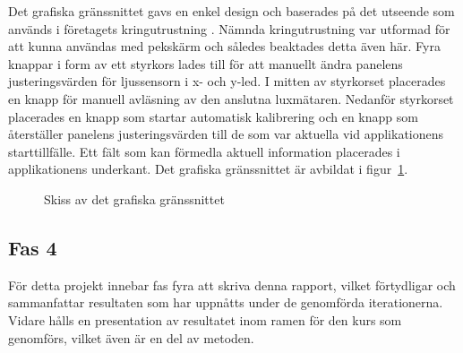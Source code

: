             Det grafiska gränssnittet gavs en enkel design och baserades på det utseende som används i företagets kringutrustning \cite{solarremote}. Nämnda kringutrustning var utformad för att kunna användas med pekskärm och således beaktades detta även här. Fyra knappar i form av ett styrkors lades till för att manuellt ändra panelens justeringsvärden för ljussensorn i x- och y-led. I mitten av styrkorset placerades en knapp för manuell avläsning av den anslutna luxmätaren. Nedanför styrkorset placerades en knapp som startar automatisk kalibrering och en knapp som återställer panelens justeringsvärden till de som var aktuella vid applikationens starttillfälle. Ett fält som kan förmedla aktuell information placerades i applikationens underkant. Det grafiska gränssnittet är avbildat i figur~\ref{fig:app_skiss}.

            \begin{figure}[hb]
                
            \caption{\label{fig:app_skiss} Skiss av det grafiska gränssnittet}
            \end{figure}



    \subsection{Fas 4} %
    \label{sub:fas_4}
        För detta projekt innebar fas fyra att skriva denna rapport, vilket förtydligar och sammanfattar resultaten som har uppnåtts under de genomförda iterationerna. Vidare hålls en presentation av resultatet inom ramen för den kurs som genomförs, vilket även är en del av metoden.
